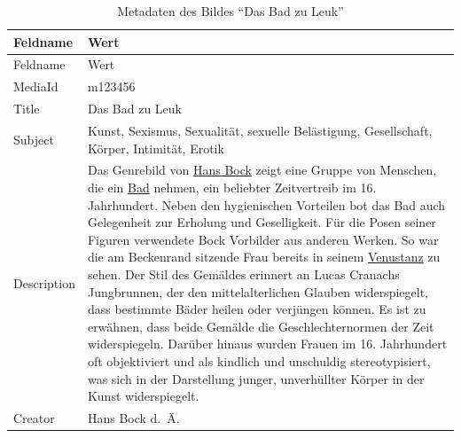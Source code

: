 \documentclass[
  letterpaper,
  DIV=11,
  numbers=noendperiod]{scrartcl}
\begin{document}
\begin{longtable}[]{@{}
  >{\raggedright\arraybackslash}p{}
  >{\raggedright\arraybackslash}p{}@{}}
\caption{Metadaten des Bildes ``Das Bad zu
Leuk''}\label{tbl-metadaten-das-bad-zu-leuk}\tabularnewline
\toprule\noalign{}
\begin{minipage}[b]{\linewidth}\raggedright
Feldname
\end{minipage} & \begin{minipage}[b]{\linewidth}\raggedright
Wert
\end{minipage} \\
\midrule\noalign{}
\endfirsthead
\toprule\noalign{}
\begin{minipage}[b]{\linewidth}\raggedright
Feldname
\end{minipage} & \begin{minipage}[b]{\linewidth}\raggedright
Wert
\end{minipage} \\
\midrule\noalign{}
\endhead
\bottomrule\noalign{}
\endlastfoot
MediaId & m123456 \\
Title & Das Bad zu Leuk \\
Subject & Kunst, Sexismus, Sexualität, sexuelle Belästigung,
Gesellschaft, Körper, Intimität, Erotik \\
Description & Das Genrebild von
\href{https://hls-dhs-dss.ch/de/articles/019088/2002-11-07/}{Hans Bock}
zeigt eine Gruppe von Menschen, die ein
\href{https://hls-dhs-dss.ch/de/articles/016308/2017-05-04/\#HVondenAnfE4ngenbisindiefrFCheNeuzeit}{Bad}
nehmen, ein beliebter Zeitvertreib im 16. Jahrhundert. Neben den
hygienischen Vorteilen bot das Bad auch Gelegenheit zur Erholung und
Geselligkeit. Für die Posen seiner Figuren verwendete Bock Vorbilder aus
anderen Werken. So war die am Beckenrand sitzende Frau bereits in seinem
\href{https://stadtgeschichtebasel.ch/blog/1000-jahre-10-geschichten-skandal-goetzendienst-und-bilderstreit-im-basler-muenster}{Venustanz}
zu sehen. Der Stil des Gemäldes erinnert an Lucas Cranachs Jungbrunnen,
der den mittelalterlichen Glauben widerspiegelt, dass bestimmte Bäder
heilen oder verjüngen können. Es ist zu erwähnen, dass beide Gemälde die
Geschlechternormen der Zeit widerspiegeln. Darüber hinaus wurden Frauen
im 16. Jahrhundert oft objektiviert und als kindlich und unschuldig
stereotypisiert, was sich in der Darstellung junger, unverhüllter Körper
in der Kunst widerspiegelt. \\
Creator & Hans Bock d.~Ä.

\end{longtable}
\end{document}
